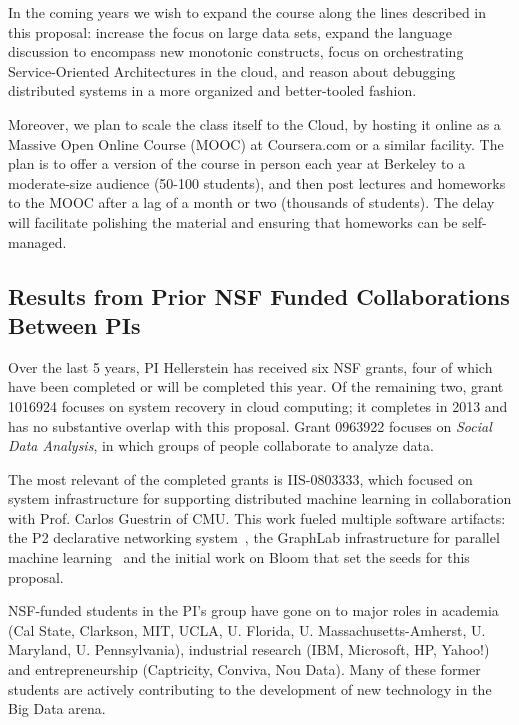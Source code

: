 In the coming years we wish to expand the course along the lines described in this proposal: increase the focus on large data sets, expand the language discussion to encompass new monotonic constructs, focus on orchestrating Service-Oriented Architectures in the cloud, and reason about debugging distributed systems in a more organized and better-tooled fashion.  

Moreover, we plan to scale the class itself to the Cloud, by hosting it online as a Massive Open Online Course (MOOC) at Coursera.com or a similar facility.  The plan is to offer a version of the course in person each year at Berkeley to a moderate-size audience (50-100 students), and then post lectures and homeworks to the MOOC after a lag of a month or two (thousands of students). The delay will facilitate polishing the material and ensuring that homeworks can be self-managed.

\subsection{Results from Prior NSF Funded Collaborations Between PIs}
\label{sec:prior}

Over the last 5 years, PI Hellerstein has received six NSF grants, four of which have been completed or will be completed this year.  Of the remaining two, grant 1016924 focuses on system recovery in cloud computing; it
completes in 2013 and has no substantive overlap with this
proposal. Grant 0963922 focuses on \emph{Social Data Analysis}, in which groups of people collaborate to analyze data. 

The most relevant of the completed grants is IIS-0803333, which focused on system infrastructure for supporting distributed machine learning in collaboration with Prof. Carlos Guestrin of CMU.  This work fueled multiple software artifacts: the P2 declarative networking system~\cite{p2}, the GraphLab infrastructure for parallel machine learning~\cite{uaigraphlab} and the initial work on Bloom that set the seeds for this proposal.  

NSF-funded students in the PI's group have gone on to major roles in academia (Cal State, Clarkson, MIT, UCLA, U. Florida, U. Massachusetts-Amherst, U. Maryland, U. Pennsylvania), industrial research (IBM, Microsoft, HP, Yahoo!) and entrepreneurship (Captricity, Conviva, Nou Data).  Many of these former students are actively contributing to the development of new technology in the Big Data arena.

